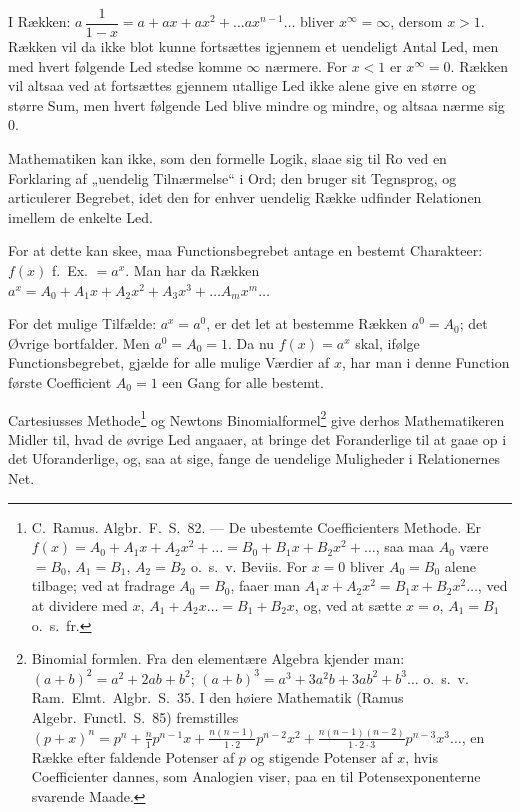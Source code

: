 \documentclass[12pt]{book}
\newcommand{\opage}[1]{\marginnote{\footnotesize\textit{[#1]}}}
\begin{document}
I Rækken: $a\,\dfrac{1}{1-x} = a + ax + ax^{2} + \dots ax^{n-1}\dots$ bliver
$x^{\infty} = \infty$, dersom $x > 1$. Rækken vil da ikke blot kunne fortsættes
igjennem et uendeligt Antal Led, men med hvert følgende Led stedse komme $\infty$
nærmere. For $x < 1$ er $x^{\infty} = 0$. Rækken vil altsaa ved at fortsættes
gjennem utallige Led ikke alene give en større og større Sum, men hvert følgende
Led blive mindre og mindre, og altsaa nærme sig $0$.

Mathematiken kan ikke, som den formelle Logik, slaae sig til Ro ved en Forklaring
af „uendelig Tilnærmelse“ i
\opage{28} Ord; den bruger sit Tegnsprog, og articulerer Begrebet, idet den for enhver
uendelig Række udfinder Relationen imellem de enkelte Led.

For at dette kan skee, maa Functionsbegrebet antage en bestemt Charakteer: $f(x)$
f.\ Ex. $= a^{x}$. Man har da Rækken
$a^{x} = A_0 + A_1 x + A_2 x^{2} + A_3 x^{3} + \dots A_m x^{m} \dots$

For det mulige Tilfælde: $a^{x} = a^{0}$, er det let at bestemme Rækken
$a^{0} = A_0$; det Øvrige bortfalder. Men $a^{0} = A_0 = 1$. Da nu $f(x) = a^{x}$
skal, ifølge Functionsbegrebet, gjælde for alle mulige Værdier af $x$, har man i
denne Function første Coefficient $A_0 = 1$ een Gang for alle bestemt.

Cartesiusses Methode\footnote{C.\ Ramus. Algbr.\ F.\ S.\ 82. --- De ubestemte
Coefficienters Methode. Er $f(x) = A_0 + A_1 x + A_2 x^{2} + \dots
= B_0 + B_1 x + B_2 x^{2} + \dots$, saa maa $A_0$ være $= B_0$, $A_1 = B_1$,
$A_2 = B_2$ o.\ s.\ v. Beviis. For $x = 0$ bliver $A_0 = B_0$ alene tilbage; ved
at fradrage $A_0 = B_0$, faaer man $A_1 x + A_2 x^{2} = B_1 x + B_2 x^{2}\dots$,
ved at dividere med $x$, $A_1 + A_2 x\dots = B_1 + B_2 x$, og, ved at sætte
$x = o$, $A_1 = B_1$ o.\ s.\ fr.} og Newtons Binomialformel\footnote{Binomial\-%
formlen. Fra den elementære Algebra kjender man: $(a+b)^{2} = a^{2} + 2ab +
b^{2}$; $(a+b)^{3} = a^{3} + 3a^{2}b + 3ab^{2} + b^{3}\dots$ o.\ s.\ v. Ram.\
Elmt.\ Algbr.\ S.\ 35. I den høiere Mathematik (Ramus Algebr.\ Functl.\ S.\ 85)
fremstilles $(p+x)^{n} = p^{n} + \frac{n}{1}p^{n-1}x + \frac{n(n-1)}{1\cdot 2}
p^{n-2}x^{2} + \frac{n(n-1)(n-2)}{1\cdot 2\cdot 3}p^{n-3}x^{3}\dots$, en Række
efter faldende Potenser af $p$ og stigende Potenser af $x$, hvis Coefficienter
dannes, som Analogien viser, paa en til Potensexponenterne svarende Maade.} give
derhos Mathematikeren Midler til, hvad de øvrige Led angaaer, at bringe det
Foranderlige til at gaae op i det Uforanderlige, og, saa at sige, fange de
uendelige Muligheder i Relationernes Net.
\end{document}
